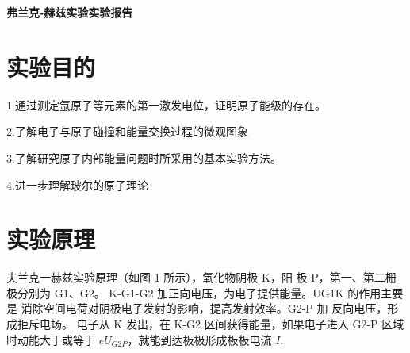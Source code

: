 \documentclass[a4paper,UTF8]{ctexart}
\begin{document}
\begin{center}
    \textbf{\Large 弗兰克-赫兹实验实验报告}
    \par {}
\end{center}

\section{实验目的}

1.通过测定氩原子等元素的第一激发电位，证明原子能级的存在。

2.了解电子与原子碰撞和能量交换过程的微观图象

3.了解研究原子内部能量问题时所采用的基本实验方法。

4.进一步理解玻尔的原子理论

\section{实验原理}

夫兰克一赫兹实验原理（如图 1 所示），氧化物阴极 K，阳
极 P，第一、第二栅极分别为 G1、G2。
K-G1-G2 加正向电压，为电子提供能量。UG1K 的作用主要是
消除空间电荷对阴极电子发射的影响，提高发射效率。G2-P 加
反向电压，形成拒斥电场。
电子从 K 发出，在 K-G2 区间获得能量，如果电子进入 G2-P
区域时动能大于或等于 $eU_{G2P}$，就能到达板极形成板极电流 $I$.
\end{document}
